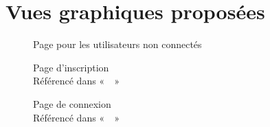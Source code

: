 \chapter{Vues graphiques proposées}

\begin{figure}
    \caption{Page pour les utilisateurs non connectés}
    \centering
    \label{fig:Accueil - Non connecté}
\end{figure} 

\begin{figure}
    \caption[Page d'inscription]{Page d'inscription\\Référencé dans «~~»}
    \centering
    \label{fig:Inscription}
\end{figure}

\begin{figure} 
    \caption[Page de connexion]{Page de connexion\\Référencé dans «~~»}
    \centering
    \label{fig:Connexion}
\end{figure}

